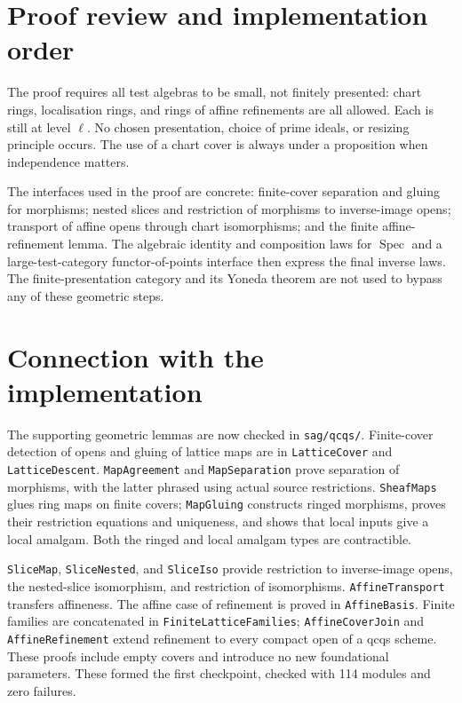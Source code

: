 \documentclass[11pt]{amsart}
\theoremstyle{remark}\newtheorem{remark}[theorem]{Remark}
\newcommand{\Spec}{\operatorname{Spec}}
\begin{document}
\section{Proof review and implementation order}
The proof requires all test algebras to be small, not finitely presented:
chart rings, localisation rings, and rings of affine refinements are all
allowed. Each is still at level $\ell$. No chosen presentation, choice
of prime ideals, or resizing principle occurs. The use of a chart cover
is always under a proposition when independence matters.

The interfaces used in the proof are concrete: finite-cover separation and
gluing for morphisms; nested slices and restriction of morphisms to
inverse-image opens; transport of affine opens through chart
isomorphisms; and the finite affine-refinement lemma. The algebraic
identity and composition laws for $\Spec$ and a large-test-category
functor-of-points interface then express the final inverse laws.
The finite-presentation category and its Yoneda theorem are not used to
bypass any of these geometric steps.

\section{Connection with the implementation}
The supporting geometric lemmas are now checked in
\texttt{sag/qcqs/}. Finite-cover detection of opens and gluing of lattice
maps are in \texttt{LatticeCover} and \texttt{LatticeDescent}.
\texttt{MapAgreement} and \texttt{MapSeparation} prove separation of
morphisms, with the latter phrased using actual source restrictions.
\texttt{SheafMaps} glues ring maps on finite covers;
\texttt{MapGluing} constructs ringed morphisms, proves their restriction
equations and uniqueness, and shows that local inputs give a local
amalgam. Both the ringed and local amalgam types are contractible.

\texttt{SliceMap}, \texttt{SliceNested}, and \texttt{SliceIso} provide
restriction to inverse-image opens, the nested-slice isomorphism, and
restriction of isomorphisms. \texttt{AffineTransport} transfers
affineness. The affine case of refinement is proved in
\texttt{AffineBasis}. Finite families are concatenated in
\texttt{FiniteLatticeFamilies}; \texttt{AffineCoverJoin} and
\texttt{AffineRefinement} extend refinement to every compact open of a qcqs
scheme. These proofs include empty covers and introduce no new
foundational parameters. These formed the first checkpoint, checked with
114 modules and zero failures.
\end{document}

